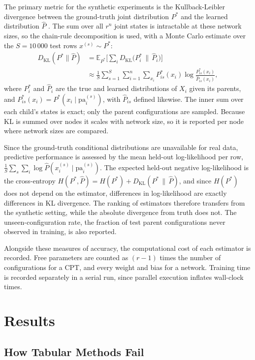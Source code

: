 \documentclass[a4paper,fleqn]{cas-dc}
\newcommand{\KL}{D_{\mathrm{KL}}}
\begin{document}
The primary metric for the synthetic experiments is the Kullback-Leibler divergence between the ground-truth joint distribution $P^*$ and the learned distribution $\hat P$ \citep[App.~A.1.3]{koller2009probabilistic}. The sum over all $r^n$ joint states is intractable at these network sizes, so the chain-rule decomposition is used, with a Monte Carlo estimate over the $S=10\,000$ test rows $x^{(s)}\sim P^*$:
\begin{align*}
\KL(P^*\|\hat P) &= \mathbb{E}_{P^*}\Big[\sum_{i} \KL\big(P^*_{i}\,\|\,\hat P_{i}\big)\Big] \\
&\approx \frac{1}{S}\sum_{s=1}^{S}\sum_{i=1}^{n}\sum_{x_i} P^*_{is}(x_i)\log\frac{P^*_{is}(x_i)}{\hat P_{is}(x_i)},
\end{align*}
where $P^*_{i}$ and $\hat P_{i}$ are the true and learned distributions of $X_i$ given its parents, and $P^*_{is}(x_i) = P^*(x_i\mid \mathrm{pa}_i^{(s)})$, with $\hat P_{is}$ defined likewise.
The inner sum over each child's states is exact; only the parent configurations are sampled. Because KL is summed over nodes it scales with network size, so it is reported per node where network sizes are compared.

Since the ground-truth conditional distributions are unavailable for real data, predictive performance is assessed by the mean held-out log-likelihood per row, $\frac{1}{S}\sum_s\sum_i \log\hat P(x_i^{(s)}\mid\mathrm{pa}_i^{(s)})$. The expected held-out negative log-likelihood is the cross-entropy $H(P^*,\hat P) = H(P^*) + \KL(P^*\,\|\,\hat P)$, and since $H(P^*)$ does not depend on the estimator, differences in log-likelihood are exactly differences in KL divergence. The ranking of estimators therefore transfers from the synthetic setting, while the absolute divergence from truth does not. The unseen-configuration rate, the fraction of test parent configurations never observed in training, is also reported.

Alongside these measures of accuracy, the computational cost of each estimator is recorded. Free parameters are counted as $(r-1)$ times the number of configurations for a CPT, and every weight and bias for a network. Training time is recorded separately in a serial run, since parallel execution inflates wall-clock times.

\section{Results}\label{sec:results}

\subsection{How Tabular Methods Fail}
\end{document}
